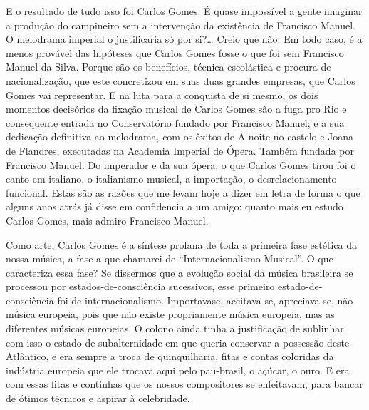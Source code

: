 E o resultado de tudo isso foi Carlos Gomes. É quase impossível a gente
imaginar a produção do campineiro sem a intervenção da existência de
Francisco Manuel. O melodrama imperial o justificaria só por si?\ldots{}
Creio que não. Em todo caso, é a menos provável das hipóteses que Carlos
Gomes fosse o que foi sem Francisco Manuel da Silva. Porque são os
benefícios, técnica escolástica e procura de nacionalização, que este
concretizou em suas duas grandes empresas, que Carlos Gomes vai
representar. E na luta para a conquista de si mesmo, os dois momentos
decisórios da fixação musical de Carlos Gomes são a fuga pro Rio e
consequente entrada no Conservatório fundado por Francisco Manuel; e a
sua dedicação definitiva ao melodrama, com os êxitos de A noite no
castelo e Joana de Flandres, executadas na Academia Imperial de Ópera.
Também fundada por Francisco Manuel. Do imperador e da sua ópera, o que
Carlos Gomes tirou foi o canto em italiano, o italianismo musical, a
importação, o desrelacionamento funcional. Estas são as razões que me
levam hoje a dizer em letra de forma o que alguns anos atrás já disse em
confidencia a um amigo: quanto mais eu estudo Carlos Gomes, mais admiro
Francisco Manuel.

Como arte, Carlos Gomes é a síntese profana de toda a primeira fase
estética da nossa música, a fase a que chamarei de ``Internacionalismo
Musical''. O que caracteriza essa fase? Se dissermos que a evolução
social da música brasileira se processou por estados-de-consciência
sucessivos, esse primeiro estado-de-consciência foi de
internacionalismo. Importavase, aceitava-se, apreciava-se, não música
europeia, pois que não existe propriamente música europeia, mas as
diferentes músicas europeias. O colono ainda tinha a justificação de
sublinhar com isso o estado de subalternidade em que queria conservar a
possessão deste Atlântico, e era sempre a troca de quinquilharia, fitas
e contas coloridas da indústria europeia que ele trocava aqui pelo
pau-brasil, o açúcar, o ouro. E era com essas fitas e continhas que os
nossos compositores se enfeitavam, para bancar de ótimos técnicos e
aspirar à celebridade.

